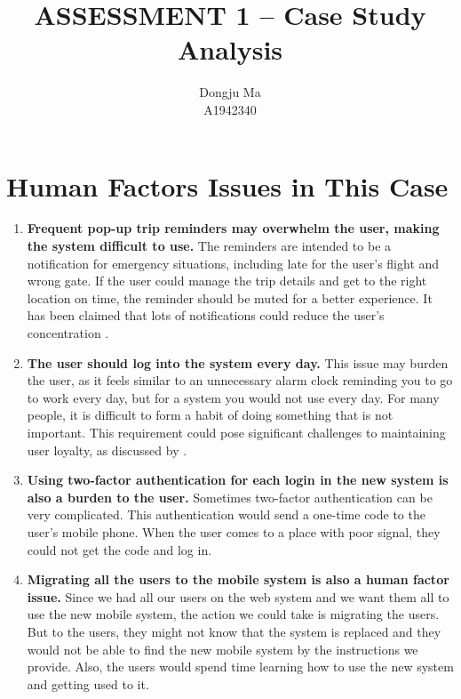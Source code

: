 \documentclass[12pt]{article}
\title{\textbf{ASSESSMENT 1 -- Case Study Analysis}}
\author{Dongju Ma \\ A1942340}
\date{}
\begin{document}
\maketitle

\section{Human Factors Issues in This Case}

\begin{enumerate}[label=\alph*)]
  \item \textbf{Frequent pop-up trip reminders may overwhelm the user, making the system difficult to use.}
  The reminders are intended to be a notification for emergency situations, including late for the user's flight and wrong gate. If the user could manage the trip details and get to the right location on time, the reminder should be muted for a better experience. It has been claimed that lots of notifications could reduce the user's concentration \citep{benyon2019designing}.

  \item \textbf{The user should log into the system every day.}
  This issue may burden the user, as it feels similar to an unnecessary alarm clock reminding you to go to work every day, but for a system you would not use every day. For many people, it is difficult to form a habit of doing something that is not important. This requirement could pose significant challenges to maintaining user loyalty, as discussed by \citet{oliver1999loyalty}.

  \item \textbf{Using two-factor authentication for each login in the new system is also a burden to the user.}
  Sometimes two-factor authentication can be very complicated. This authentication would send a one-time code to the user's mobile phone. When the user comes to a place with poor signal, they could not get the code and log in.

  \item \textbf{Migrating all the users to the mobile system is also a human factor issue.}
  Since we had all our users on the web system and we want them all to use the new mobile system, the action we could take is migrating the users. But to the users, they might not know that the system is replaced and they would not be able to find the new mobile system by the instructions we provide. Also, the users would spend time learning how to use the new system and getting used to it.
\end{enumerate}
\end{document}
